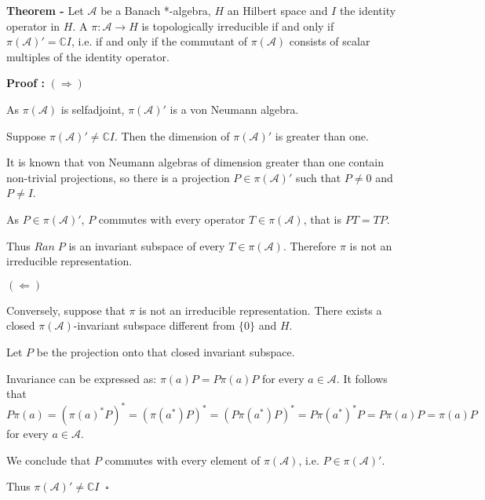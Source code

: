 \documentclass[12pt]{article}
\begin{document}

{\bf Theorem -} Let $\mathcal{A}$ be a Banach *-algebra, $H$ an Hilbert space and $I$ the identity operator in $H$. A  $\pi : \mathcal{A} \longrightarrow H$ is topologically irreducible if and only if $\pi(\mathcal{A})' = \mathbb{C}I$, i.e. if and only if the commutant of $\pi(\mathcal{A})$ consists of scalar multiples of the identity operator.

{\bf Proof :} $(\Longrightarrow)$

As $\pi(\mathcal{A})$ is selfadjoint, $\pi(\mathcal{A})'$ is a von Neumann algebra.

Suppose $\pi(\mathcal{A})' \neq \mathbb{C}I$. Then the dimension of $\pi(\mathcal{A})'$ is greater than one.

It is known that von Neumann algebras of dimension greater than one contain non-trivial projections, so there is a projection $P \in \pi(\mathcal{A})'$ such that $P \neq 0$ and $P \neq I$.

As $P \in \pi(\mathcal{A})'$, $P$ commutes with every operator $T \in \pi(\mathcal{A})$, that is $PT=TP$.

Thus $Ran \; P$ is an invariant subspace of every $T \in \pi(\mathcal{A})$. Therefore $\pi$ is not an irreducible representation.

$(\Longleftarrow)$

Conversely, suppose that $\pi$ is not an irreducible representation. There exists a closed $\pi(\mathcal{A})$-invariant subspace different from $\{0\}$ and $H$.

Let $P$ be the projection onto that closed invariant subspace.

Invariance can be expressed as: $\pi(a)P = P \pi(a) P$ for every $a \in \mathcal{A}$. It follows that
\begin{displaymath}
P\pi(a) = (\pi(a)^*P)^*=(\pi(a^*)P)^*=(P\pi(a^*)P)^*=P\pi(a^*)^*P=P\pi(a)P=\pi(a)P
\end{displaymath}
for every $a \in \mathcal{A}$.

We conclude that $P$ commutes with every element of $\pi(\mathcal{A})$, i.e. $P \in \pi(\mathcal{A})'$.

Thus $\pi(\mathcal{A})' \neq \mathbb{C}I \;\; \square$ 
\end{document}
